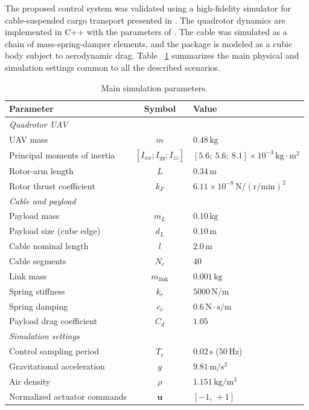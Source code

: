 \documentclass[sn-mathphys-num]{sn-jnl}
\theoremstyle{thmstyleone}%
\theoremstyle{thmstyletwo}%
\theoremstyle{thmstylethree}%
\begin{document}
The proposed control system was validated using a high-fidelity simulator for cable-suspended cargo transport presented in \cite{salinas2023unified}. The quadrotor dynamics are implemented in C++ with the parameters of \cite{michael2010grasp}. The cable was simulated as a chain of mass-spring-damper elements, and the package is modeled as a cubic body subject to aerodynamic drag. Table ~\ref{tab:sim_params} summarizes the main physical and simulation settings common to all the described scenarios.

\begin{table}[ht]
\centering
\caption{Main simulation parameters.}
\label{tab:sim_params}
\renewcommand{\arraystretch}{1.15}
\setlength{\tabcolsep}{5pt}
\begin{tabular}{l c l}
\toprule
\textbf{Parameter} & \textbf{Symbol} & \textbf{Value} \\
\midrule
\multicolumn{3}{l}{\textit{Quadrotor UAV} \cite{michael2010grasp}} \\ %
UAV mass & $m$ & $0.48\,\mathrm{kg}$ \\
Principal moments of inertia & $[I_{xx}; I_{yy}; I_{zz}]$ & $[5.6;\ 5.6;\ 8.1]\times10^{-3}\,\mathrm{kg{\cdot}m^2}$ \\
Rotor-arm length & $L$ & $0.34\,\mathrm{m}$ \\
Rotor thrust coefficient & $k_F$ & $6.11\times10^{-8}\,\mathrm{N/(r/min)^2}$ \\
\midrule
\multicolumn{3}{l}{\textit{Cable and payload}} \\
Payload mass & $m_L$ & $0.10\,\mathrm{kg}$ \\
Payload size (cube edge) & $d_L$ & $0.10\,\mathrm{m}$ \\
Cable nominal length & $l$ & $2.0\,\mathrm{m}$ \\
Cable segments & $N_c$ & $40$ \\
Link mass & $m_{\mathrm{link}}$ & $0.001\,\mathrm{kg}$ \\
Spring stiffness & $k_c$ & $5000\,\mathrm{N/m}$ \\
Spring damping & $c_c$ & $0.6\,\mathrm{N{\cdot}s/m}$ \\
Payload drag coefficient & $C_d$ & $1.05$ \\
\midrule
\multicolumn{3}{l}{\textit{Simulation settings}} \\
Control sampling period & $T_c$ & $0.02\,\mathrm{s}$ ($50\,\mathrm{Hz}$) \\
Gravitational acceleration & $g$ & $9.81\,\mathrm{m/s^2}$ \\
Air density & $\rho$ & $1.151\,\mathrm{kg/m^3}$ \\
Normalized actuator commands & $\mathbf{u}$ & $[-1,\,+1]$ \\
\bottomrule
\end{tabular}

\vspace{0.15cm}
\end{table}
\end{document}
